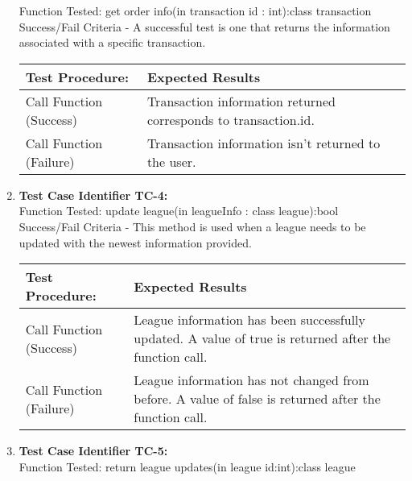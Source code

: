 \begin{enumerate}
    Function Tested: get order info(in transaction id : int):class transaction\\

    Success/Fail Criteria - A successful test is one that returns the
    information associated with a specific transaction.\\

    \begin{longtable}{|p{2in}|p{4.5in}|}
    \hline
    {\large \color{color1}Test Procedure:}&{\large \color{color1}Expected Results}\\ \hline
    Call Function (Success) & Transaction information returned corresponds to
    transaction.id. \\ \hline
    Call Function (Failure) & Transaction information isn't returned to the
    user. \\ \hline
    \end{longtable}
    \vspace{5mm}


  \item
    \textbf{Test Case Identifier TC-4:}\\

    Function Tested: update league(in leagueInfo : class league):bool\\

    Success/Fail Criteria - This method is used when a league needs to be
    updated with the newest information provided.\\

    \begin{longtable}{|p{2in}|p{4.5in}|}
    \hline
    {\large \color{color1}Test Procedure:}&{\large \color{color1}Expected Results}\\ \hline
    Call Function (Success) & League information has been successfully updated.
    A value of true is returned after the function call. \\ \hline
    Call Function (Failure) & League information has not changed from before.
    A value of false is returned after the function call. \\ \hline
    \end{longtable}
    \vspace{5mm}


  \item
    \textbf{Test Case Identifier TC-5:}\\

    Function Tested: return league updates(in league id:int):class league\\


\end{enumerate}
